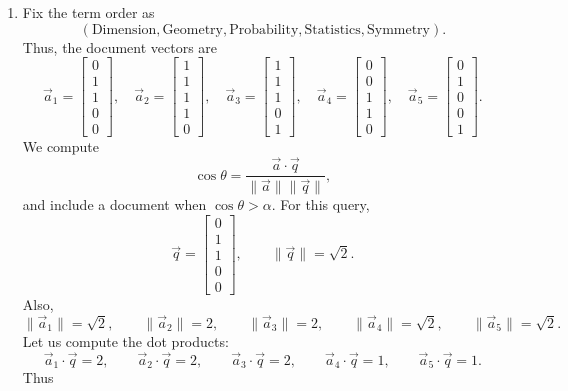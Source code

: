 \documentclass[10pt]{extarticle}
\begin{document}
\begin{enumerate}[label=\roman*.]
\item Fix the term order as
\[
(\text{Dimension},\text{Geometry},\text{Probability},\text{Statistics},\text{Symmetry}).
\]
Thus, the document vectors are
\[
\vec{a}_1=\begin{bmatrix}0\\1\\1\\0\\0\end{bmatrix},\quad
\vec{a}_2=\begin{bmatrix}1\\1\\1\\1\\0\end{bmatrix},\quad
\vec{a}_3=\begin{bmatrix}1\\1\\1\\0\\1\end{bmatrix},\quad
\vec{a}_4=\begin{bmatrix}0\\0\\1\\1\\0\end{bmatrix},\quad
\vec{a}_5=\begin{bmatrix}0\\1\\0\\0\\1\end{bmatrix}.
\]
We compute
\[
\cos\theta=\frac{\vec{a}\cdot\vec{q}}{\|\vec{a}\|\|\vec{q}\|},
\]
and include a document when $\cos\theta>\alpha$.
For this query,
\[
\vec{q}=\begin{bmatrix}0\\1\\1\\0\\0\end{bmatrix},\qquad \|\vec{q}\|=\sqrt{2}.
\]
Also,
\[
\|\vec{a}_1\|=\sqrt{2},\qquad \|\vec{a}_2\|=2,\qquad \|\vec{a}_3\|=2,\qquad \|\vec{a}_4\|=\sqrt{2},\qquad \|\vec{a}_5\|=\sqrt{2}.
\]
Let us compute the dot products:
\[
\vec{a}_1\cdot\vec{q}=2,\qquad
\vec{a}_2\cdot\vec{q}=2,\qquad
\vec{a}_3\cdot\vec{q}=2,\qquad
\vec{a}_4\cdot\vec{q}=1,\qquad
\vec{a}_5\cdot\vec{q}=1.
\]
Thus
\begin{align*}

\end{align*}
\end{enumerate}
\end{document}
